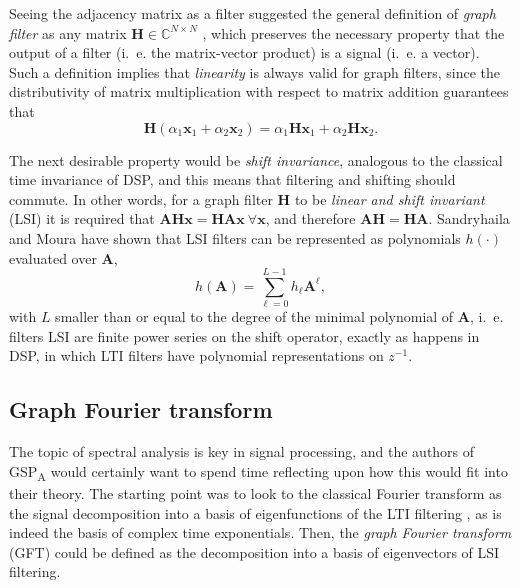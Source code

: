 Seeing the adjacency matrix as a filter suggested the general definition of \emph{graph filter} as any matrix $ \mathbf{H} \in \mathbb{C}^{N \times N} $ \cite{sandryhaila2013filters}, which preserves the necessary property that the output of a filter (i.~e. the matrix-vector product) is a signal (i.~e. a vector). Such a definition implies that \emph{linearity} is always valid for graph filters, since the distributivity of matrix multiplication with respect to matrix addition guarantees that
\begin{equation}
\mathbf{H} (\alpha_1 \mathbf{x}_1 + \alpha_2 \mathbf{x}_2) =  \alpha_1 \mathbf{H} \mathbf{x}_1 + \alpha_2 \mathbf{H}  \mathbf{x}_2.
\end{equation}

The next desirable property would be \emph{shift invariance}, analogous to the classical time invariance of DSP, and this means that filtering and shifting should commute. In other words, for a graph filter $ \mathbf{H} $ to be \emph{linear and shift invariant} (LSI) it is required that $ \mathbf{A} \mathbf{H} \mathbf{x} = \mathbf{H} \mathbf{A} \mathbf{x} \ \forall \mathbf{x}$, and therefore $ \mathbf{A} \mathbf{H} = \mathbf{H} \mathbf{A}$. Sandryhaila and Moura have shown \cite{sandryhaila2013discrete,sandryhaila2014big} that LSI filters can be represented as polynomials $ h(\cdot) $ evaluated over $ \mathbf{A} $,
\begin{equation}
\label{eq:filter_poly}
h(\mathbf{A}) = \sum_{\ell=0}^{L-1} h_\ell \mathbf{A}^\ell,
\end{equation}
with $ L $ smaller than or equal to the degree of the minimal polynomial of $ \mathbf{A} $, i.~e. filters LSI are finite power series on the shift operator, exactly as happens in DSP, in which LTI filters have polynomial representations on $ z^{-1} $.

\subsection{Graph Fourier transform}

The topic of spectral analysis is key in signal processing, and the authors of GSP\textsubscript{A} would certainly want to spend time reflecting upon how this would fit into their theory. The starting point was to look to the classical Fourier transform as the signal decomposition into a basis of eigenfunctions of the LTI filtering \cite{oppenheim1997signals}, as is indeed the basis of complex time exponentials. Then, the \emph{graph Fourier transform} (GFT) could be defined as the decomposition into a basis of eigenvectors of LSI filtering.

